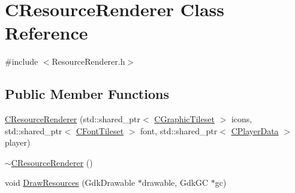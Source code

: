 \hypertarget{classCResourceRenderer}{}\section{C\+Resource\+Renderer Class Reference}
\label{classCResourceRenderer}


{\ttfamily \#include $<$Resource\+Renderer.\+h$>$}

\subsection*{Public Member Functions}
\begin{DoxyCompactItemize}
\item 
\hyperlink{classCResourceRenderer_a9deb259cfd2c01a87f9d4c5d57e962e1}{C\+Resource\+Renderer} (std\+::shared\+\_\+ptr$<$ \hyperlink{classCGraphicTileset}{C\+Graphic\+Tileset} $>$ icons, std\+::shared\+\_\+ptr$<$ \hyperlink{classCFontTileset}{C\+Font\+Tileset} $>$ font, std\+::shared\+\_\+ptr$<$ \hyperlink{classCPlayerData}{C\+Player\+Data} $>$ player)
\item 
\hyperlink{classCResourceRenderer_a4b466b8ac2568f6576a3431fe66cf390}{$\sim$\+C\+Resource\+Renderer} ()
\item 
void \hyperlink{classCResourceRenderer_ad10676ab10fe217aebbc3dca68d745b0}{Draw\+Resources} (Gdk\+Drawable $\ast$drawable, Gdk\+GC $\ast$gc)
\end{DoxyCompactItemize}
